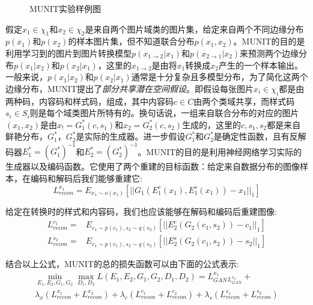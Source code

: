 \begin{figure}[t]
    \centering
    \caption{MUNIT实验样例图}
    \label{fig:munit}
\end{figure}

假定$x_1\in \chi_1$和$x_2\in \chi_2$是来自两个图片域类的图片集，给定来自两个不同边缘分布$p(x_1)$和$p(x_2)$的样本图片集，但不知道联合分布$p(x_1, x_2)$。MUNIT的目的是利用学习到的图片到图片转换模型$p(x_{1\to 2}|x_1)$和$p(x_{2\to 1}|x_2)$来预测两个边缘分布$p(x_1|x_2)$和$p(x_2|x_1)$，这里的$x_{1\to 2}$是由将$x_1$转换成$x_2$产生的一个样本输出。一般来说，$p(x_1|x_2)$和$p(x_2|x_1)$通常是十分复杂且多模型分布，为了简化这两个边缘分布，MUNIT提出了\textit{部分共享潜在空间假设}。即假设每张图片$x_i\in \chi_i$都是由两种码，内容码和样式码，组成，其中内容码$c\in C$由两个类域共享，而样式码$s_i\in S_i$则是每个域类图片所特有的。换句话说，一组来自联合分布的对应的图片$(x_1, x_2)$是由$x_!=G_1^*(c,s_1)$和$x_2=G_2^*(c, s_2)$生成的，这里的$c,s_1,s_2$都是来自鲜艳分布，$G_1^*，G_2^*$是实际的生成器。进一步假设$G_1^*$和$G_2^*$是确定性函数，且有反解码器$E_1^*=(G_1^*)^{-1}$和$E_2^*=(G_2^*)^{-1}$。MUNIT的目的是利用神经网络学习实际的生成器以及编码函数。它使用了两个重建的目标函数：给定来自数据分布的图像样本，在编码和解码后我们能够重建它:
$$L_{recon}^{x_1}=E_{x_1\sim o(x_1)}[||G_1(E_1^c(x_1), E_1^s(x_1))-x_1||_1] $$

给定在转换时的样式和内容码，我们也应该能够在解码和编码后重建图像:
\begin{align*}
    L_{recon}^{c_1}= & E_{c_1\sim p(c_1), s_2\sim q(s_2)}[||E_2^c(G_2(c_1,s_2))-c_1||_1] \\
    L_{recon}^{s_2}= & E_{c_1\sim p(c_1), s_2\sim q(s_2)}[||E_2^s(G_2(c_1, s_2))-s_2||_1]
\end{align*}

结合以上公式，MUNIT的总的损失函数可以由下面的公式表示:
\begin{gather*}
\min_{E_1,E_2,G_1,G_2}\max_{D_1,D_2}L(E_1,E_2,G_1,G_2,D_1,D_2)=L_{GAN}^{x_1}_L_{GAN}^{x_2}+\\
\lambda_x(L_{recon}^{x_1}+L_{recon}^{x_2})+\lambda_c(L_{recon}^{c_1}+L_{recon}^{c_2})+\lambda_s(L_{recon}^{s_1}+L_{recon}^{s_2})
\end{gather*}

